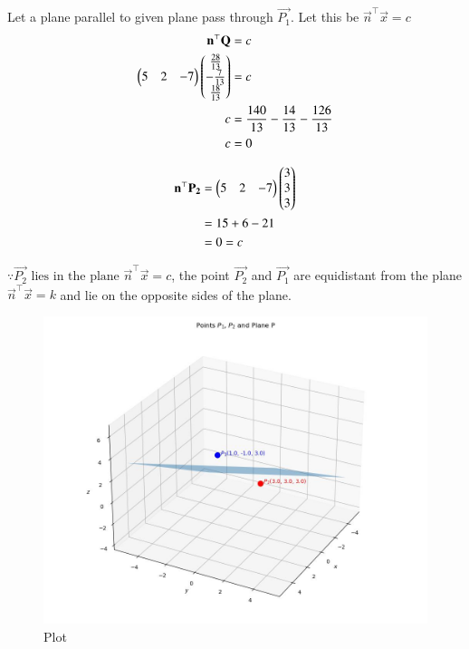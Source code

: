\documentclass[journal]{IEEEtran}
\begin{document}
Let a plane parallel to given plane pass through $\vec{P_1}$. Let this be $\vec{n}^\top\vec{x}=c$
\begin{align}
    \mathbf{n}^\top\mathbf{Q} &= c \\
    \begin{pmatrix}5 & 2 & -7\end{pmatrix}\begin{pmatrix}\frac{28}{13} \\ -\frac{7}{13} \\ \frac{18}{13}\end{pmatrix} &= c \\
    c &= \frac{140}{13}-\frac{14}{13}-\frac{126}{13} \\
    c &= 0
\end{align}

\begin{align}
    \mathbf{n}^\top\mathbf{P_2} &= \begin{pmatrix}5 & 2 & -7\end{pmatrix}\begin{pmatrix}3 \\ 3 \\ 3\end{pmatrix} \\
    &= 15+6-21 \\
    &= 0 = c
\end{align}

$\because \vec{P_2}\text{ lies in the plane }\vec{n}^\top\vec{x}=c$, the point $\vec{P_2}$ and $\vec{P_1}$ are equidistant from the plane $\vec{n}^\top\vec{x} = k$ and lie on the opposite sides of the plane.

\begin{figure}[h!]
    \centering
    \includegraphics[width=0.75\columnwidth]{figs/plot_c.jpg}
    \caption*{Plot}
    \label{fig:fig}
\end{figure}
\end{document}
